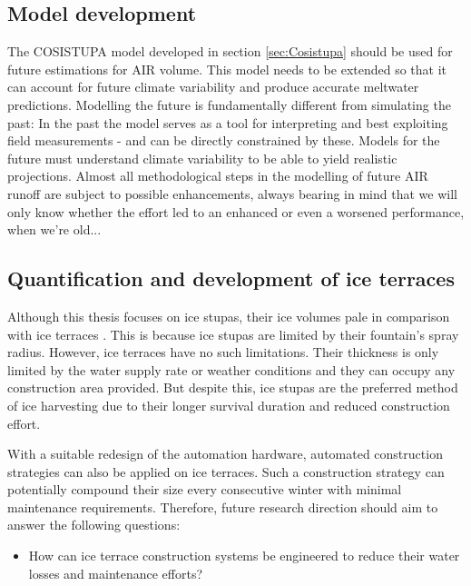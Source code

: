 \subsection{Model development}

The COSISTUPA model developed in section \ref{sec:Cosistupa} should be used for future estimations for AIR volume. This model
needs to be extended so that it can account for future climate variability and produce accurate meltwater
predictions. Modelling the future is fundamentally different from simulating the past: In the past the model
serves as a tool for interpreting and best exploiting field measurements - and can be directly constrained by
these. Models for the future must understand climate variability to be able to yield realistic projections.
Almost all methodological steps in the modelling of future AIR runoff are subject to possible enhancements,
always bearing in mind that we will only know whether the effort led to an enhanced or even a worsened
performance, when we're old...

\subsection{Quantification and development of ice terraces}

Although this thesis focuses on ice stupas, their ice volumes pale in comparison with ice terraces
\citep{nusserSociohydrologyArtificialGlaciers2019}. This is because ice stupas are limited by their fountain's
spray radius. However, ice terraces have no such limitations. Their thickness is only limited by the water
supply rate or weather conditions and they can occupy any construction area provided. But despite this, ice
stupas are the preferred method of ice harvesting due to their longer survival duration and reduced construction
effort.

With a suitable redesign of the automation hardware, automated construction strategies can also be applied on
ice terraces. Such a construction strategy can potentially compound their size every consecutive winter with
minimal maintenance requirements. Therefore, future research direction should aim to answer the following
questions:

\begin{itemize}

  \item How can ice terrace construction systems be engineered to reduce their water losses and maintenance
    efforts?

\end{itemize}

